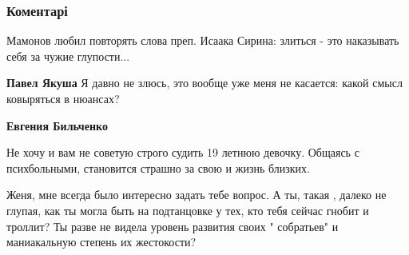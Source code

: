  
 
 
 
 
\subsubsection{Коментарі}

\begin{itemize}
 
Мамонов любил повторять слова преп. Исаака Сирина: злиться - это наказывать себя за чужие глупости...

\begin{itemize}
 
\textbf{Павел Якуша} Я давно не злюсь, это вообще уже меня не касается: какой смысл ковыряться в нюансах?

 
\textbf{Евгения Бильченко}

Не хочу и вам не советую строго судить 19 летнюю девочку. Общаясь с
психбольными, становится страшно за свою и жизнь близких.

Женя, мне всегда было интересно задать тебе вопрос. А ты, такая , далеко не
глупая, как ты могла быть на подтанцовке у тех, кто тебя сейчас гнобит и
троллит? Ты разве не видела уровень развития своих " собратьев" и маниакальную
степень их жестокости?


 

\end{itemize}
\end{itemize}
